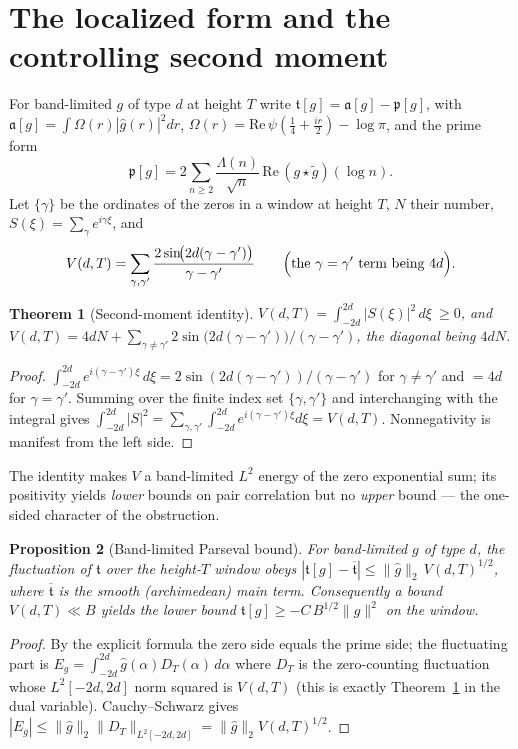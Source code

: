 \documentclass[11pt]{amsart}
\newtheorem{theorem}{Theorem}[section]
\newtheorem{proposition}[theorem]{Proposition}
\theoremstyle{definition}
\theoremstyle{remark}
\newcommand{\fa}{\mathfrak a}
\newcommand{\fp}{\mathfrak p}
\newcommand{\ft}{\mathfrak t}
\begin{document}
\section{The localized form and the controlling second moment}
For band-limited $g$ of type $d$ at height $T$ write $\ft[g]=\fa[g]-\fp[g]$, with
$\fa[g]=\int\Omega(r)|\widehat g(r)|^2dr$, $\Omega(r)=\mathrm{Re}\,\psi(\tfrac14
+\tfrac{ir}2)-\log\pi$, and the prime form
\[
\fp[g]=2\sum_{n\ge2}\frac{\Lambda(n)}{\sqrt n}\,\mathrm{Re}\,(g\star\tilde g)(\log n).
\]
Let $\{\gamma\}$ be the ordinates of the zeros in a window at height $T$, $N$
their number, $S(\xi)=\sum_\gamma e^{i\gamma\xi}$, and
\[
V(d,T)=\sum_{\gamma,\gamma'}\frac{2\sin\!\bigl(2d(\gamma-\gamma')\bigr)}{\gamma-\gamma'}
\qquad\Bigl(\text{the }\gamma=\gamma'\text{ term being }4d\Bigr).
\]

\begin{theorem}[Second-moment identity]\label{thm:id}
$\displaystyle V(d,T)=\int_{-2d}^{2d}|S(\xi)|^2\,d\xi\ \ge 0$, and
$V(d,T)=4dN+\sum_{\gamma\ne\gamma'}2\sin\!\bigl(2d(\gamma-\gamma')\bigr)/(\gamma-\gamma')$,
the diagonal being $4dN$.
\end{theorem}
\begin{proof}
$\int_{-2d}^{2d}e^{i(\gamma-\gamma')\xi}\,d\xi=2\sin(2d(\gamma-\gamma'))/
(\gamma-\gamma')$ for $\gamma\ne\gamma'$ and $=4d$ for $\gamma=\gamma'$. Summing
over the finite index set $\{\gamma,\gamma'\}$ and interchanging with the integral
gives $\int_{-2d}^{2d}|S|^2=\sum_{\gamma,\gamma'}\int_{-2d}^{2d}
e^{i(\gamma-\gamma')\xi}d\xi=V(d,T)$. Nonnegativity is manifest from the
left side.
\end{proof}

The identity makes $V$ a band-limited $L^2$ energy of the zero exponential sum;
its positivity yields \emph{lower} bounds on pair correlation but no \emph{upper}
bound --- the one-sided character of the obstruction.

\begin{proposition}[Band-limited Parseval bound]\label{prop:parseval}
For band-limited $g$ of type $d$, the fluctuation of $\ft$ over the height-$T$
window obeys $|\ft[g]-\overline{\ft}|\le\|\widehat g\|_2\,V(d,T)^{1/2}$, where
$\overline{\ft}$ is the smooth (archimedean) main term. Consequently a bound
$V(d,T)\ll B$ yields the lower bound $\ft[g]\ge-C\,B^{1/2}\|g\|^2$ on the window.
\end{proposition}
\begin{proof}
By the explicit formula the zero side equals the prime side; the fluctuating part
is $E_g=\int_{-2d}^{2d}\widehat g(\alpha)D_T(\alpha)\,d\alpha$ where $D_T$ is the
zero-counting fluctuation whose $L^2[-2d,2d]$ norm squared is $V(d,T)$ (this is
exactly Theorem~\ref{thm:id} in the dual variable). Cauchy--Schwarz gives
$|E_g|\le\|\widehat g\|_2\|D_T\|_{L^2[-2d,2d]}=\|\widehat g\|_2 V(d,T)^{1/2}$.
\end{proof}
\end{document}
